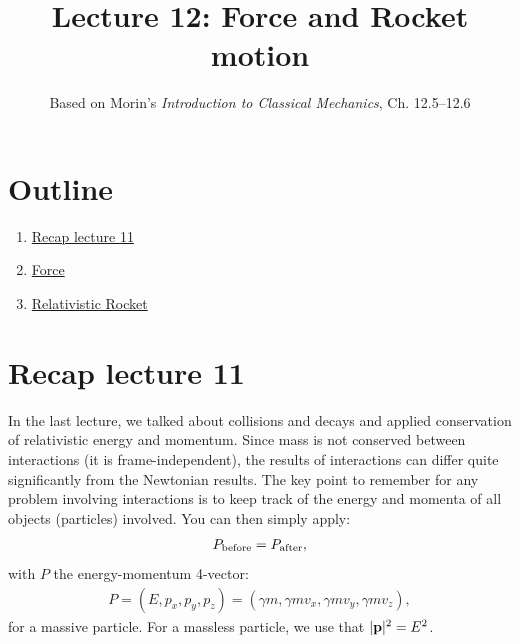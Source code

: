 \documentclass[12pt]{article}
\title{\textbf{Lecture 12: Force and Rocket motion}}
\author{Based on Morin's \textit{Introduction to Classical Mechanics}, Ch. 12.5--12.6}
\date{}
\newcommand{\be}{\begin{eqnarray}}
\newcommand{\ee}{\end{eqnarray}}
\begin{document}
\maketitle

\section*{Outline}
\begin{enumerate}
    \item \href{sec:recap}{Recap lecture 11}
    \item \href{sec:force}{Force}
    \item \href{sec:rocket}{Relativistic Rocket}
\end{enumerate}

\section{Recap lecture 11}\label{sec:recap}

In the last lecture, we talked about collisions and decays and applied conservation of relativistic energy and momentum. Since mass is not conserved between interactions (it is frame-independent), the results of interactions can differ quite significantly from the Newtonian results. The key point to remember for any problem involving interactions is to keep track of the energy and momenta of all objects (particles) involved. You can then simply apply:
\be
P_{\rm before} = P_{\rm after}, 
\ee
with $P$ the energy-momentum 4-vector: 
\be
P = (E,p_x,p_y,p_z) = (\gamma m, \gamma m v_x, \gamma m v_y, \gamma m v_z),
\ee
for a massive particle. For a massless particle, we use that $|{\bf p}|^2 = E^2$. 
\end{document}

